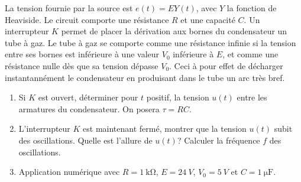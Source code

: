 \begin{exercice}%
  La tension fournie par la source est \(e(t) = E Y(t)\), avec \(Y\) la 
  fonction de Heaviside. Le circuit comporte une résistance \(R\) et une 
  capacité \(C\). Un interrupteur \(K\) permet de placer la dérivation aux 
  bornes du condensateur un tube à gaz. Le tube à gaz se comporte comme une 
  résistance infinie si la tension entre ses bornes est inférieure à une valeur 
  \(V_0\) inférieure à \(E\), et comme une résistance nulle dès que sa tension 
  dépasse \(V_0\). Ceci à pour effet de décharger instantannément le 
  condensateur en produisant dans le tube un arc très bref.

  \begin{enumerate}
    \item Si \(K\) est ouvert, déterminer pour \(t\) positif, la tension 
      \(u(t)\) entre les armatures du condensateur. On posera \(\tau = RC\).
    \item L'interrupteur \(K\) est maintenant fermé, montrer que la tension 
      \(u(t)\) subit des oscillations. Quelle est l'allure de \(u(t)\)? 
      Calculer la fréquence \(f\) des oscillations.
    \item Application numérique avec \(R=\SI{1}{\kilo\ohm}\), \(E=\SI{24}{V}\), 
      \(V_0=\SI{5}{V}\) et \(C=\SI{1}{\micro\farad}\).
  \end{enumerate}
\end{exercice}%
